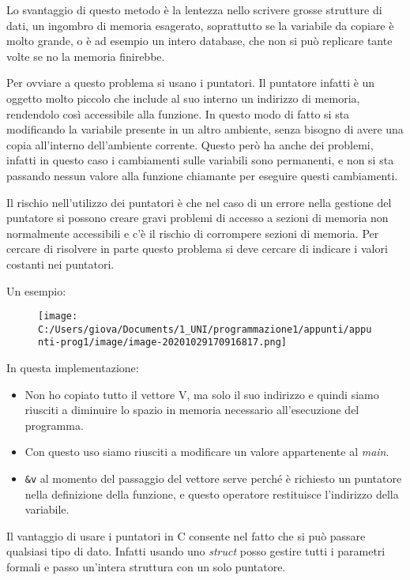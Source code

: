 \documentclass[
]{article}
\begin{document}
Lo svantaggio di questo metodo è la lentezza nello scrivere grosse
strutture di dati, un ingombro di memoria esagerato, soprattutto se la
variabile da copiare è molto grande, o è ad esempio un intero database,
che non si può replicare tante volte se no la memoria finirebbe.

Per ovviare a questo problema si usano i puntatori. Il puntatore infatti
è un oggetto molto piccolo che include al suo interno un indirizzo di
memoria, rendendolo così accessibile alla funzione. In questo modo di
fatto si sta modificando la variabile presente in un altro ambiente,
senza bisogno di avere una copia all'interno dell'ambiente corrente.
Questo però ha anche dei problemi, infatti in questo caso i cambiamenti
sulle variabili sono permanenti, e non si sta passando nessun valore
alla funzione chiamante per eseguire questi cambiamenti.

Il rischio nell'utilizzo dei puntatori è che nel caso di un errore nella
gestione del puntatore si possono creare gravi problemi di accesso a
sezioni di memoria non normalmente accessibili e c'è il rischio di
corrompere sezioni di memoria. Per cercare di risolvere in parte questo
problema si deve cercare di indicare i valori costanti nei puntatori.

Un esempio:

\begin{figure}
\centering
\texttt{[image: C:/Users/giova/Documents/1\_UNI/programmazione1/appunti/appunti-prog1/image/image-20201029170916817.png]}
\caption{}
\end{figure}

In questa implementazione:

\begin{itemize}
\item
  Non ho copiato tutto il vettore V, ma solo il suo indirizzo e quindi
  siamo riusciti a diminuire lo spazio in memoria necessario
  all'esecuzione del programma.
\item
  Con questo uso siamo riusciti a modificare un valore appartenente al
  \emph{main}.
\item
  \texttt{\&v} al momento del passaggio del vettore serve perché è
  richiesto un puntatore nella definizione della funzione, e questo
  operatore restituisce l'indirizzo della variabile.
\end{itemize}

Il vantaggio di usare i puntatori in C consente nel fatto che si può
passare qualsiasi tipo di dato. Infatti usando uno \emph{struct} posso
gestire tutti i parametri formali e passo un'intera struttura con un
solo puntatore.
\end{document}
